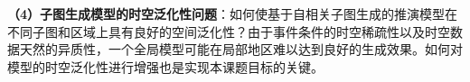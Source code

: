 \textbf{（4）子图生成模型的时空泛化性问题}：如何使基于自相关子图生成的推演模型在不同子图和区域上具有良好的空间泛化性？由于事件条件的时空稀疏性以及时空数据天然的异质性，一个全局模型可能在局部地区难以达到良好的生成效果。如何对模型的时空泛化性进行增强也是实现本课题目标的关键。





\iffalse

